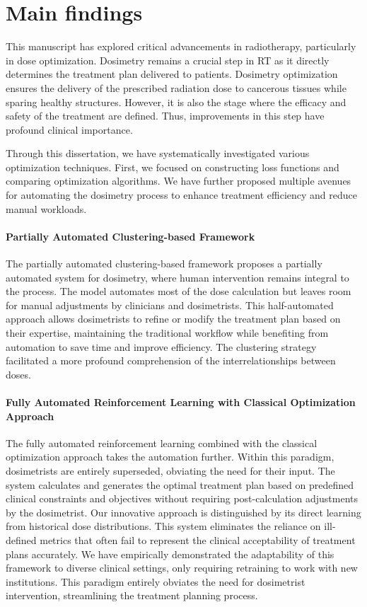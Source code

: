 \section{Main findings}
This manuscript has explored critical advancements in radiotherapy, particularly in dose optimization.
Dosimetry remains a crucial step in RT as it directly determines the treatment plan delivered to patients.
Dosimetry optimization ensures the delivery of the prescribed radiation dose to cancerous tissues while sparing healthy structures.
However, it is also the stage where the efficacy and safety of the treatment are defined.
Thus, improvements in this step have profound clinical importance.

Through this dissertation, we have systematically investigated various optimization techniques.
First, we focused on constructing loss functions and comparing optimization algorithms.
We have further proposed multiple avenues for automating the dosimetry process to enhance treatment efficiency and reduce manual workloads.

\paragraph{Partially Automated Clustering-based Framework}
The partially automated clustering-based framework proposes a partially automated system for dosimetry, where human intervention remains integral to the process.
The model automates most of the dose calculation but leaves room for manual adjustments by clinicians and dosimetrists.
This half-automated approach allows dosimetrists to refine or modify the treatment plan based on their expertise, maintaining the traditional workflow while benefiting from automation to save time and improve efficiency.
The clustering strategy facilitated a more profound comprehension of the interrelationships between doses.

\paragraph{Fully Automated Reinforcement Learning with Classical Optimization Approach}
The fully automated reinforcement learning combined with the classical optimization approach takes the automation further.
Within this paradigm, dosimetrists are entirely superseded, obviating the need for their input.
The system calculates and generates the optimal treatment plan based on predefined clinical constraints and objectives without requiring post-calculation adjustments by the dosimetrist.
Our innovative approach is distinguished by its direct learning from historical dose distributions.
This system eliminates the reliance on ill-defined metrics that often fail to represent the clinical acceptability of treatment plans accurately.
We have empirically demonstrated the adaptability of this framework to diverse clinical settings, only requiring retraining to work with new institutions.
This paradigm entirely obviates the need for dosimetrist intervention, streamlining the treatment planning process.

